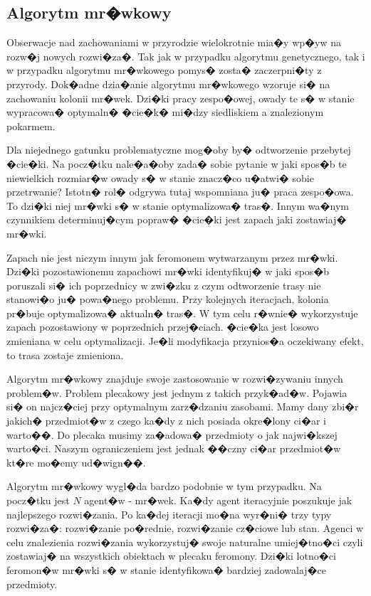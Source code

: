 \subsection{Algorytm mr�wkowy}

Obserwacje nad zachowaniami w przyrodzie wielokrotnie mia�y wp�yw na rozw�j nowych rozwi�za�. Tak jak w przypadku algorytmu genetycznego, tak i w przypadku algorytmu mr�wkowego pomys� zosta� zaczerpni�ty z przyrody. Dok�adne dzia�anie algorytmu mr�wkowego wzoruje si� na zachowaniu kolonii mr�wek. Dzi�ki pracy zespo�owej, owady te s� w stanie wypracowa� optymaln� �cie�k� mi�dzy siedliskiem a znalezionym pokarmem.

Dla niejednego gatunku problematyczne mog�oby by� odtworzenie przebytej �cie�ki. Na pocz�tku nale�a�oby zada� sobie pytanie w jaki spos�b te niewielkich rozmiar�w owady s� w stanie znacz�co u�atwi� sobie przetrwanie? Istotn� rol� odgrywa tutaj wspomniana ju� praca zespo�owa. To dzi�ki niej mr�wki s� w stanie optymalizowa� tras�. Innym wa�nym czynnikiem determinuj�cym popraw� �cie�ki jest zapach jaki zostawiaj� mr�wki. 

Zapach nie jest niczym innym jak feromonem wytwarzanym przez mr�wki. Dzi�ki pozostawionemu zapachowi mr�wki identyfikuj� w jaki spos�b poruszali si� ich poprzednicy w zwi�zku z czym odtworzenie trasy nie stanowi�o ju� powa�nego problemu. Przy kolejnych iteracjach, kolonia pr�buje optymalizowa� aktualn� tras�. W tym celu r�wnie� wykorzystuje zapach pozostawiony w poprzednich przej�ciach. �cie�ka jest losowo zmieniana w celu optymalizacji. Je�li modyfikacja przynios�a oczekiwany efekt, to trasa zostaje zmieniona.

Algorytm mr�wkowy znajduje swoje zastosowanie w rozwi�zywaniu innych problem�w. Problem plecakowy jest jednym z takich przyk�ad�w. Pojawia si� on najcz�ciej przy optymalnym zarz�dzaniu zasobami. Mamy dany zbi�r jakich� przedmiot�w z czego ka�dy z nich posiada okre�lony ci�ar i warto��. Do plecaka musimy za�adowa� przedmioty o jak najwi�kszej warto�ci. Naszym ograniczeniem jest jednak ��czny ci�ar przedmiot�w kt�re mo�emy ud�wign��. 

Algorytm mr�wkowy wygl�da bardzo podobnie w tym przypadku. Na pocz�tku jest $N$ agent�w - mr�wek. Ka�dy agent iteracyjnie poszukuje jak najlepszego rozwi�zania. Po ka�dej iteracji mo�na wyr�ni� trzy typy rozwi�za�: rozwi�zanie po�rednie, rozwi�zanie cz�ciowe lub stan. Agenci w celu znalezienia rozwi�zania wykorzystuj� swoje naturalne umiej�tno�ci czyli zostawiaj� na wszystkich obiektach w plecaku feromony. Dzi�ki lotno�ci feromon�w mr�wki s� w stanie identyfikowa� bardziej zadowalaj�ce przedmioty.

